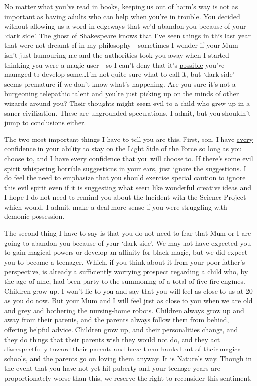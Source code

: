 \begin{writtenNote}

No matter what you've read in books, keeping us out of harm's way is
\underline{not} as important as having adults who can help when you're in
trouble. You decided without allowing us a word in edgeways that we'd abandon you
because of your `dark side'. The ghost of Shakespeare knows that I've seen
things in this last year that were not dreamt of in my philosophy---sometimes I
wonder if your Mum isn't just humouring me and the authorities took you away
when I started thinking you were a magic-user---so I can't deny that it's
\underline{possible} you've managed to develop some…I'm not quite sure
what to call it, but `dark side' seems premature if we don't know what's
happening. Are you sure it's not a burgeoning telepathic talent and you're just
picking up on the minds of other wizards around you? Their thoughts might seem
evil to a child who grew up in a saner civilization. These are ungrounded
speculations, I admit, but you shouldn't jump to conclusions either.

The two most important things I have to tell you are this. First, son, I
have \underline{every} confidence in your ability to stay on the Light Side of
the Force so long as you choose to, and I have every confidence that you will
choose to. If there's some evil spirit whispering horrible suggestions in your
ears, just ignore the suggestions. I \underline{do} feel the need to emphasize
that you should exercise special caution to ignore this evil spirit even if it
is suggesting what seem like wonderful creative ideas and I hope I do not need
to remind you about the Incident with the Science Project which would, I admit,
make a deal more sense if you were struggling with demonic possession.

The second thing I have to say is that you do not need to fear that Mum
or I are going to abandon you because of your `dark side'. We may not have
expected you to gain magical powers or develop an affinity for black magic, but
we did expect you to become a teenager. Which, if you think about it from your
poor father's perspective, is already a sufficiently worrying prospect
regarding a child who, by the age of nine, had been party to the summoning of a
total of five fire engines. Children grow up. I won't lie to you and say that
you will feel as close to us at 20 as you do now. But your Mum and I will feel
just as close to you when we are old and grey and bothering the nursing-home
robots. Children always grow up and away from their parents, and the parents
always follow them from behind, offering helpful advice. Children grow up, and
their personalities change, and they do things that their parents wish they
would not do, and they act disrespectfully toward their parents and have them
hauled out of their magical schools, and the parents go on loving them anyway.
It is Nature's way. Though in the event that you have not yet hit puberty and
your teenage years are proportionately worse than this, we reserve the right to
reconsider this sentiment.


\end{writtenNote}
